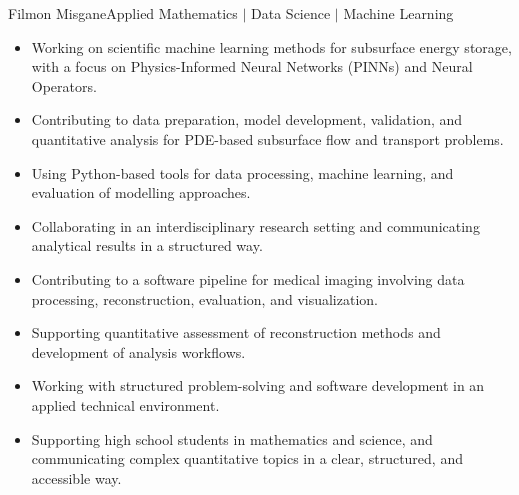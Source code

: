 \documentclass{article}
\begin{document}
\begin{cv}{Filmon Misgane}{Applied Mathematics $|$ Data Science $|$ Machine Learning}
    \begin{cvevent}[04.2026][Present]  
        \begin{itemize}
            \item Working on scientific machine learning methods for subsurface energy storage, with a focus on Physics-Informed Neural Networks (PINNs) and Neural Operators.
            \item Contributing to data preparation, model development, validation, and quantitative analysis for PDE-based subsurface flow and transport problems.
            \item Using Python-based tools for data processing, machine learning, and evaluation of modelling approaches.
            \item Collaborating in an interdisciplinary research setting and communicating analytical results in a structured way.
        \end{itemize}
        \hrulefill
    \end{cvevent}

    \begin{cvevent}[04.2026][Present]  
        \begin{itemize}
            \item Contributing to a software pipeline for medical imaging involving data processing, reconstruction, evaluation, and visualization.
            \item Supporting quantitative assessment of reconstruction methods and development of analysis workflows.
            \item Working with structured problem-solving and software development in an applied technical environment.
        \end{itemize}
        \hrulefill
    \end{cvevent}

    \begin{cvevent}[08.2022][Present]  
        \begin{itemize}
            \item Supporting high school students in mathematics and science, and communicating complex quantitative topics in a clear, structured, and accessible way.
        \end{itemize}
        \hrulefill
    \end{cvevent}


\end{cv}
\end{document}
